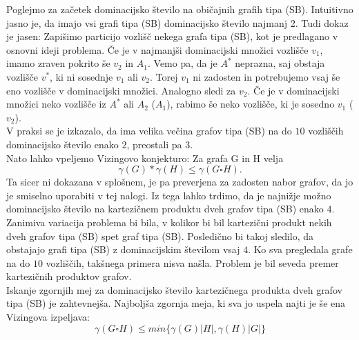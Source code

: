 \documentclass{article}
\begin{document}
Poglejmo za začetek dominacijsko število na običajnih grafih tipa (SB).
Intuitivno jasno je, da imajo vsi grafi tipa (SB) dominacijsko število najmanj 2. Tudi dokaz je jasen:
Zapišimo particijo vozlišč nekega grafa tipa (SB), kot je predlagano v osnovni ideji problema.
Če je v najmanjši dominacijski množici vozlišče $v_1$, imamo zraven pokrito še $v_2$ in 
$A_1$. Vemo pa, da je $A^*$ neprazna, saj obstaja vozlišče $v^*$, ki ni 
sosednje $v_1$ ali $v_2$. Torej $v_1$ ni zadosten in potrebujemo vsaj še eno vozlišče v dominacijski množici.
Analogno sledi za $v_2$. Če je v dominacijski množici neko vozlišče iz $A^*$ ali $A_2$ ($A_1$), rabimo še neko
vozlišče, ki je sosedno $v_1$ ($v_2$). 
\\
V praksi se je izkazalo, da ima velika večina grafov tipa (SB) na do $10$
vozliščih dominacijsko število enako $2$, preostali pa $3$. 
\\
Nato lahko vpeljemo Vizingovo konjekturo: Za grafa G in H velja
$$ \gamma(G)*\gamma(H) \leq \gamma(G\square H). $$
Ta sicer ni dokazana v splošnem, je pa preverjena za zadosten nabor grafov, da jo je smiselno uporabiti v 
tej nalogi.
Iz tega lahko trdimo, da je najnižje možno dominacijsko število na 
kartezičnem produktu dveh grafov tipa (SB) enako $4$. 
\\
Zanimiva variacija problema bi bila, v kolikor bi bil kartezični produkt nekih
dveh grafov tipa (SB) spet graf tipa (SB). Posledično bi takoj sledilo, da obstajajo 
grafi tipa (SB) z dominacijskim številom vsaj $4$. Ko sva pregledala grafe na do $10$ vozliščih, 
takšnega primera nisva našla. Problem je bil seveda premer kartezičnih produktov grafov.
\\
Iskanje zgornjih mej za dominacijsko število kartezičnega produkta dveh grafov tipa (SB) je zahtevnejša.
Najboljša zgornja meja, ki sva jo uspela najti je še ena Vizingova izpeljava:
$$ \gamma(G\square H) \leq min\{\gamma(G)\lvert H \rvert, \gamma(H)\lvert G \rvert\}$$
\end{document}
